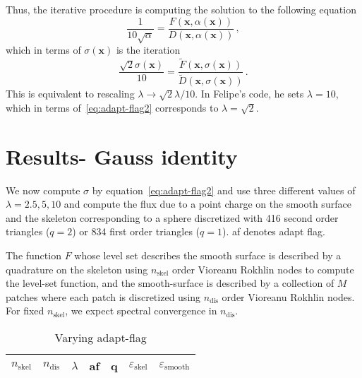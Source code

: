 \documentclass[11pt, oneside]{article}   	%
\newcommand\bx{\boldsymbol x}
\newcommand\nskel{n_{\textrm{skel}}}
\newcommand\ndis{n_{\textrm{dis}}}
\newcommand\eskel{\varepsilon_{\textrm{skel}}}
\newcommand\esmooth{\varepsilon_{\textrm{smooth}}}
\begin{document}
Thus, the iterative procedure is computing the solution to the following equation
\begin{equation}
\frac{1}{10\sqrt{\alpha}} = \frac{F(\bx,\alpha(\bx))}{D(\bx,\alpha(\bx))} \, ,
\end{equation}
which in terms of $\sigma(\bx)$ is the iteration
\begin{equation}
\frac{\sqrt{2}\sigma(\bx)}{10} = \frac{\tilde{F}(\bx,\sigma(\bx))}{\tilde{D}(\bx,\sigma(\bx))} \, .
\end{equation}
This is equivalent to rescaling $\lambda \to \sqrt{2}\lambda /10$. 
In Felipe's code, he sets $\lambda = 10$, which in terms of~\cref{eq:adapt-flag2}
corresponds to $\lambda = \sqrt{2}$. 


\section{Results- Gauss identity}
We now compute $\sigma$ by equation~\cref{eq:adapt-flag2} and
use three different values of $\lambda=2.5,5,10$ and compute
the flux due to a point charge on the smooth surface and the skeleton
corresponding to a sphere discretized with 416 second order triangles ($q=2$) 
or 834 first order triangles ($q=1$). af denotes adapt flag.

The function $F$ whose level set describes the smooth surface is 
described by a quadrature on the skeleton 
using $\nskel$ order Vioreanu Rokhlin nodes to compute the level-set function,
and the smooth-surface is described by a collection of $M$ patches
where each patch is discretized using $\ndis$ order Vioreanu Rokhlin nodes.
For fixed $\nskel$, we expect spectral convergence in $\ndis$.
\begin{table}[!ht]
\begin{center}
\begin{tabular}{|c|c|c|c|c|c|c|}
\hline
$\nskel$ & $\ndis$ & $\lambda$ & af & q & $\eskel$ & $\esmooth$ \\ \hline

\end{tabular}
\caption{Varying adapt-flag}
\end{center}
\end{table}
\end{document}
